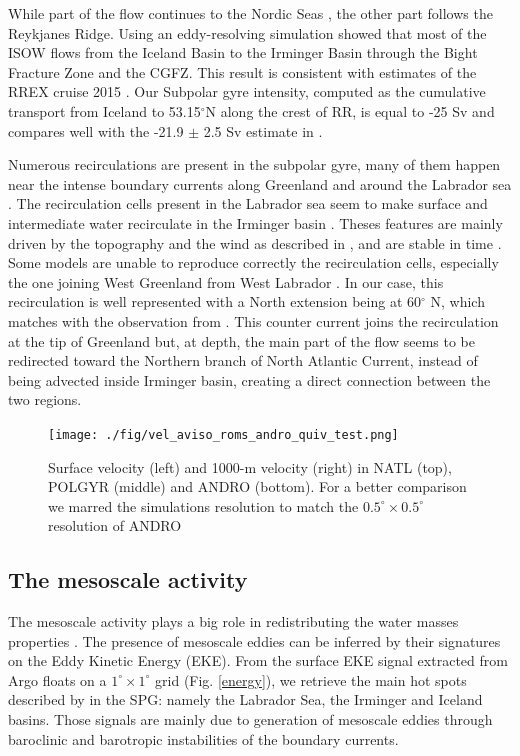 \documentclass[11pt,a4paper]{article}
\begin{document}
While part of the flow continues to the Nordic Seas \citep{rossby2012}, the other part follows the Reykjanes Ridge. Using an eddy-resolving simulation \citet{Xu2010} showed that most of the ISOW flows from the Iceland Basin to the Irminger Basin through the Bight Fracture Zone and the CGFZ. This result is consistent with estimates of the RREX cruise 2015 \citep{petit2018}. Our Subpolar gyre intensity, computed as the cumulative transport from Iceland to 53.15$^{\circ}$N along the crest of RR, is equal to -25 Sv  and compares well with the -21.9 $\pm$ 2.5 Sv  estimate in \citet{petit2018}. 


Numerous recirculations are present in the subpolar gyre, many of them happen near the intense boundary currents along Greenland and around the Labrador sea \citep{reverdin2003, flatau2003,cuny2002}. The recirculation cells present in the Labrador sea \citep{lavender2000,cuny2002} seem to make surface and intermediate water recirculate in the Irminger basin \citep{Holliday2009}. Theses features are mainly driven by the topography and the wind as described in \citet{kase200,spall2003}, and are stable in time \citep{palter2016}. Some models are unable to reproduce correctly the recirculation cells, especially the one joining West Greenland from West Labrador \citep{treguier2005}. In our case, this recirculation is well represented with a North extension being at 60$^{\circ}$ N, which matches with the observation from \citep{lavender2005}. This counter current joins the recirculation at the tip of Greenland but, at depth, the main part of the flow seems to be redirected toward the Northern branch of North Atlantic Current, instead of being advected inside Irminger basin, creating a direct connection between the two regions.

\begin{figure}[H]
\centerline{\texttt{[image: ./fig/vel\_aviso\_roms\_andro\_quiv\_test.png]}}
\caption{Surface velocity (left) and 1000-m velocity (right) in NATL (top), POLGYR (middle) and ANDRO (bottom). For a better comparison we marred the simulations resolution to match the $0.5^{\circ}\times0.5^{\circ}$ resolution of ANDRO}
\label{vel}
\end{figure}

\subsection{The mesoscale activity}

The mesoscale activity plays a big role in redistributing the water masses properties \citep{dejong2016,zhao2018b}. The presence of mesoscale eddies can be inferred by their signatures on the Eddy Kinetic Energy (EKE). From the surface EKE signal extracted from Argo floats on a $1^{\circ}\times1^{\circ}$ grid (Fig. \ref{energy}), we retrieve the main hot spots described by \citet{flatau2003} in the SPG: namely the Labrador Sea, the Irminger and Iceland basins. Those signals are mainly due to generation of mesoscale eddies through baroclinic and barotropic instabilities of the boundary currents.
\end{document}

